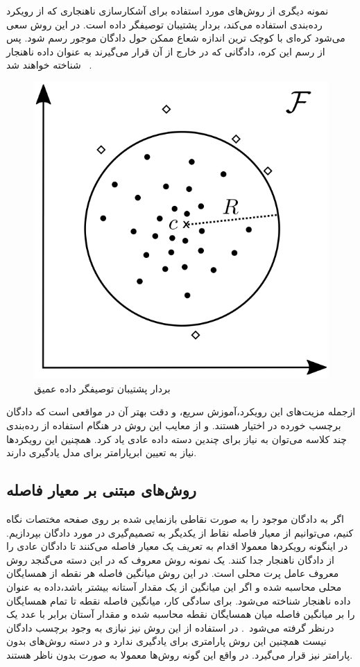 \documentclass[12pt,a4paper]{report}
\begin{document}
نمونه دیگری از روش‌های مورد استفاده برای آشکارسازی ناهنجاری که از رویکرد رده‌بندی استفاده می‌کند، بردار پشتیبان توصیفگر داده‌ است. در این روش سعی می‌شود کره‌ای با کوچک ترین اندازه شعاع ممکن حول دادگان موجور رسم شود. پس از رسم این کره، دادگانی که در خارج از آن قرار می‌گیرند به عنوان داده ناهنجار شناخته خواهند شد~\cite{pmlr-v80-ruff18a} .
\begin{figure}[!h]
	\begin{center}
		\includegraphics[width=0.5\linewidth]{./images/figures/svdd.png}
	\end{center}
	\caption{بردار پشتیبان توصیفگر داده عمیق~\cite{pmlr-v80-ruff18a}}
	\label{fig:deep-svdd}
	\centering
\end{figure}

ازجمله مزیت‌های این رویکرد،‌آموزش سریع، و دقت بهتر آن در مواقعی است که دادگان برچسب خورده در اختیار هستند. و از معایب این روش در هنگام استفاده از رده‌بندی چند کلاسه می‌توان به نیاز برای چندین دسته داده عادی یاد کرد. همچنین این رویکرد‌ها نیاز به تعیین ابرپارامتر برای مدل یادگیری دارند.

\subsection{روش‌های مبتنی بر معیار فاصله}
اگر به دادگان موجود را به صورت نقاطی بازنمایی شده بر روی صفحه مختصات نگاه کنیم،‌ می‌توانیم از معیار فاصله نقاط از یکدیگر به تصمیم‌گیری در مورد دادگان بپردازیم. در اینگونه رویکرد‌ها معمولا اقدام به تعریف یک معیار فاصله می‌کنند تا دادگان عادی را از دادگان ناهنجار جدا کنند. یک نمونه روش معروف که در این دسته می‌گنجد روش معروف عامل پرت محلی است. در این روش میانگین فاصله هر نقطه از همسایگان محلی محاسبه شده و اگر این میانگین از یک مقدار آستانه بیشتر باشد،‌داده به عنوان داده ناهنجار شناخته می‌شود. برای سادگی کار، میانگین فاصله نقطه تا تمام همسایگان را بر میانگین فاصله میان همسایگان نقطه محاسبه شده و مقدار آستان برابر با عدد یک درنظر گرفته می‌شود~\cite{10.1145/342009.335388}. در استفاده از این روش نیز نیازی به وجود برچسب دادگان نیست همچنین این روش پارامتری برای یادگیری ندارد و در دسته روش‌های بدون پارامتر نیز قرار می‌گیرد. در واقع این گونه روش‌ها معمولا به صورت بدون ناظر هستند.
\end{document}
